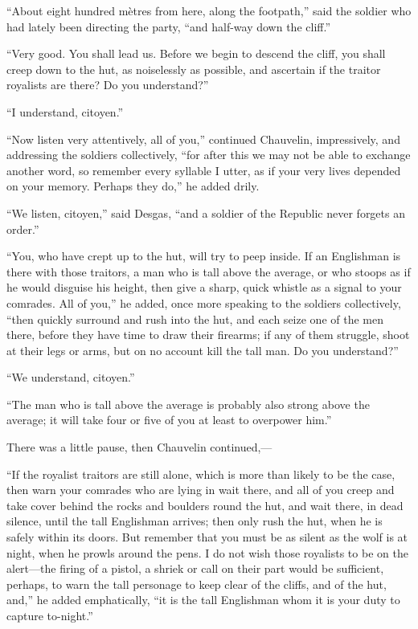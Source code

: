 \documentclass[paper=5.5in:8.5in,BCOR=7mm,twoside,DIV=calc,12pt,usegeometry,chapterprefix,endperiod,headings=big]{scrbook}
\begin{document}
\enquote{About eight hundred mètres from here, along the footpath,} said the soldier who had lately been directing the party, \enquote{and half-way down the cliff.}

\enquote{Very good. You shall lead us. Before we begin to descend the cliff, you shall creep down to the hut, as noiselessly as possible, and ascertain if the traitor royalists are there? Do you understand?}

\enquote{I understand, citoyen.}

\enquote{Now listen very attentively, all of you,} continued Chauvelin, impressively, and addressing the soldiers collectively, \enquote{for after this we may not be able to exchange another word, so remember every syllable I utter, as if your very lives depended on your memory. Perhaps they do,} he added drily.

\enquote{We listen, citoyen,} said Desgas, \enquote{and a soldier of the Republic never forgets an order.}

\enquote{You, who have crept up to the hut, will try to peep inside. If an Englishman is there with those traitors, a man who is tall above the average, or who stoops as if he would disguise his height, then give a sharp, quick whistle as a signal to your comrades. All of you,} he added, once more speaking to the soldiers collectively, \enquote{then quickly surround and rush into the hut, and each seize one of the men there, before they have time to draw their firearms; if any of them struggle, shoot at their legs or arms, but on no account kill the tall man. Do you understand?}

\enquote{We understand, citoyen.}

\enquote{The man who is tall above the average is probably also strong above the average; it will take four or five of you at least to overpower him.}

There was a little pause, then Chauvelin continued,---

\enquote{If the royalist traitors are still alone, which is more than likely to be the case, then warn your comrades who are lying in wait there, and all of you creep and take cover behind the rocks and boulders round the hut, and wait there, in dead silence, until the tall Englishman arrives; then only rush the hut, when he is safely within its doors. But remember that you must be as silent as the wolf is at night, when he prowls around the pens. I do not wish those royalists to be on the alert---the firing of a pistol, a shriek or call on their part would be sufficient, perhaps, to warn the tall personage to keep clear of the cliffs, and of the hut, and,} he added emphatically, \enquote{it is the tall Englishman whom it is your duty to capture to-night.}
\end{document}
